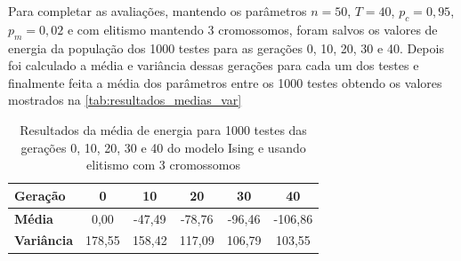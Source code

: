 Para completar as avaliações, mantendo os parâmetros \(n = 50\), \(T = 40\), \(p_c = 0,95\), \(p_m = 0,02\) e com elitismo mantendo 3 cromossomos, foram salvos os valores de energia da população dos 1000 testes para as gerações 0, 10, 20, 30 e 40. Depois foi calculado a média e variância dessas gerações para cada um dos testes e finalmente feita a média dos parâmetros entre os 1000 testes obtendo os valores mostrados na \autoref{tab:resultados_medias_var}

\begin{table}[h!]
	\centering
	\begin{tabular}{|l|c|c|c|c|c|}
		\hline
		\textbf{Geração}   & \textbf{0} & \textbf{10} & \textbf{20} & \textbf{30} & \textbf{40} \\ \hline
		\textbf{Média}     & 0,00       & -47,49      & -78,76      & -96,46      & -106,86      \\ \hline
		\textbf{Variância} & 178,55     & 158,42      & 117,09       & 106,79       & 103,55       \\ \hline
	\end{tabular}
	\caption{Resultados da média de energia para 1000 testes das gerações 0, 10, 20, 30 e 40 do modelo Ising e usando elitismo com 3 cromossomos}
	\label{tab:resultados_medias_var}
\end{table}

